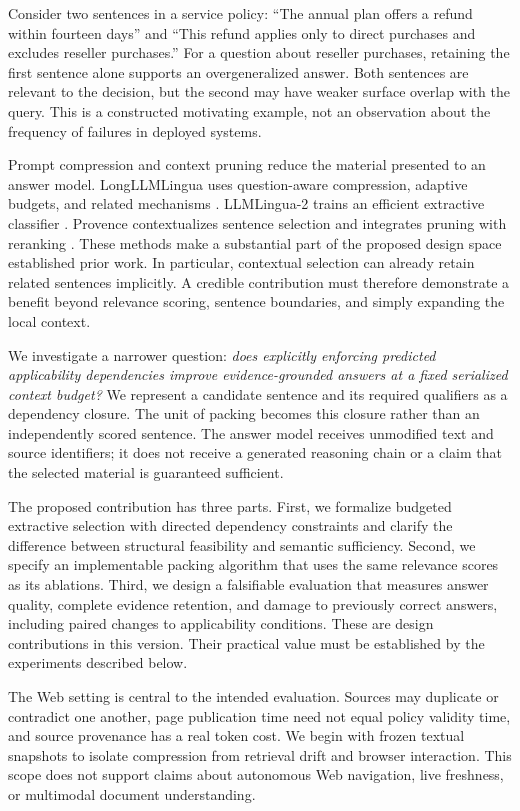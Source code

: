 \documentclass[10pt,twocolumn]{article}
\begin{document}
Consider two sentences in a service policy: ``The annual plan offers a refund within fourteen days'' and ``This refund applies only to direct purchases and excludes reseller purchases.'' For a question about reseller purchases, retaining the first sentence alone supports an overgeneralized answer. Both sentences are relevant to the decision, but the second may have weaker surface overlap with the query. This is a constructed motivating example, not an observation about the frequency of failures in deployed systems.

Prompt compression and context pruning reduce the material presented to an answer model. LongLLMLingua uses question-aware compression, adaptive budgets, and related mechanisms \cite{longlingua}. LLMLingua-2 trains an efficient extractive classifier \cite{lingua2}. Provence contextualizes sentence selection and integrates pruning with reranking \cite{provence}. These methods make a substantial part of the proposed design space established prior work. In particular, contextual selection can already retain related sentences implicitly. A credible contribution must therefore demonstrate a benefit beyond relevance scoring, sentence boundaries, and simply expanding the local context.

We investigate a narrower question: \emph{does explicitly enforcing predicted applicability dependencies improve evidence-grounded answers at a fixed serialized context budget?} We represent a candidate sentence and its required qualifiers as a dependency closure. The unit of packing becomes this closure rather than an independently scored sentence. The answer model receives unmodified text and source identifiers; it does not receive a generated reasoning chain or a claim that the selected material is guaranteed sufficient.

The proposed contribution has three parts. First, we formalize budgeted extractive selection with directed dependency constraints and clarify the difference between structural feasibility and semantic sufficiency. Second, we specify an implementable packing algorithm that uses the same relevance scores as its ablations. Third, we design a falsifiable evaluation that measures answer quality, complete evidence retention, and damage to previously correct answers, including paired changes to applicability conditions. These are design contributions in this version. Their practical value must be established by the experiments described below.

The Web setting is central to the intended evaluation. Sources may duplicate or contradict one another, page publication time need not equal policy validity time, and source provenance has a real token cost. We begin with frozen textual snapshots to isolate compression from retrieval drift and browser interaction. This scope does not support claims about autonomous Web navigation, live freshness, or multimodal document understanding.
\end{document}
